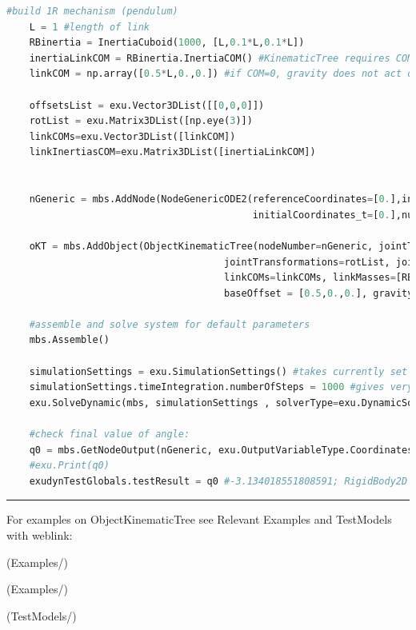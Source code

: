 \begin{lstlisting}[language=Python, firstnumber=1]
    #build 1R mechanism (pendulum)
    L = 1 #length of link
    RBinertia = InertiaCuboid(1000, [L,0.1*L,0.1*L])
    inertiaLinkCOM = RBinertia.InertiaCOM() #KinematicTree requires COM inertia
    linkCOM = np.array([0.5*L,0.,0.]) #if COM=0, gravity does not act on pendulum!

    offsetsList = exu.Vector3DList([[0,0,0]])
    rotList = exu.Matrix3DList([np.eye(3)])
    linkCOMs=exu.Vector3DList([linkCOM])
    linkInertiasCOM=exu.Matrix3DList([inertiaLinkCOM])
    
    
    nGeneric = mbs.AddNode(NodeGenericODE2(referenceCoordinates=[0.],initialCoordinates=[0.],
                                           initialCoordinates_t=[0.],numberOfODE2Coordinates=1))

    oKT = mbs.AddObject(ObjectKinematicTree(nodeNumber=nGeneric, jointTypes=[exu.JointType.RevoluteZ], linkParents=[-1],
                                      jointTransformations=rotList, jointOffsets=offsetsList, linkInertiasCOM=linkInertiasCOM,
                                      linkCOMs=linkCOMs, linkMasses=[RBinertia.mass], 
                                      baseOffset = [0.5,0.,0.], gravity=[0.,-9.81,0.]))

    #assemble and solve system for default parameters
    mbs.Assemble()
    
    simulationSettings = exu.SimulationSettings() #takes currently set values or default values
    simulationSettings.timeIntegration.numberOfSteps = 1000 #gives very accurate results
    exu.SolveDynamic(mbs, simulationSettings , solverType=exu.DynamicSolverType.RK67) #highly accurate!

    #check final value of angle:
    q0 = mbs.GetNodeOutput(nGeneric, exu.OutputVariableType.Coordinates)
    #exu.Print(q0)
    exudynTestGlobals.testResult = q0 #-3.134018551808591; RigidBody2D with 2e6 time steps gives: -3.134018551809384

\end{lstlisting}

\vspace{6pt}\par\noindent\rule{\textwidth}{0.4pt}
%
\noindent For examples on ObjectKinematicTree see Relevant Examples and TestModels with weblink:
\bi
\item {} (Examples/)
\item {} (Examples/)
\item {} (TestModels/)

